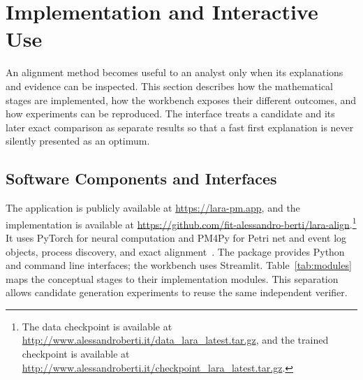 \section{Implementation and Interactive Use}
\label{sec:implementation}

An alignment method becomes useful to an analyst only when its explanations and evidence can be inspected. This section describes how the mathematical stages are implemented, how the workbench exposes their different outcomes, and how experiments can be reproduced. The interface treats a candidate and its later exact comparison as separate results so that a fast first explanation is never silently presented as an optimum.

\subsection{Software Components and Interfaces}

The application is publicly available at \url{https://lara-pm.app}, and the implementation is available at \url{https://github.com/fit-alessandro-berti/lara-align}.\footnote{The data checkpoint is available at \url{http://www.alessandroberti.it/data_lara_latest.tar.gz}, and the trained checkpoint is available at \url{http://www.alessandroberti.it/checkpoint_lara_latest.tar.gz}.} It uses PyTorch for neural computation and PM4Py for Petri net and event log objects, process discovery, and exact alignment~\cite{Berti2023}. The package provides Python and command line interfaces; the workbench uses Streamlit. Table~\ref{tab:modules} maps the conceptual stages to their implementation modules. This separation allows candidate generation experiments to reuse the same independent verifier.


